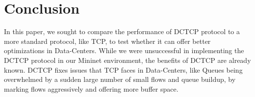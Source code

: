 \documentclass[%
 reprint,
amsmath,amssymb,
aps,
]{revtex4-2}
\begin{document}
\section{Conclusion}
In this paper, we sought to compare the performance of DCTCP protocol to a more standard protocol, like TCP, to test whether it can offer better optimizations in Data-Centers. While we were unsuccessful in implementing the DCTCP protocol in our Mininet environment, the benefits of DCTCP are already known. DCTCP fixes issues that TCP faces in Data-Centers, like Queues being overwhelmed by a sudden large number of small flows and queue buildup, by marking flows aggressively and offering more buffer space. 
\end{document}
